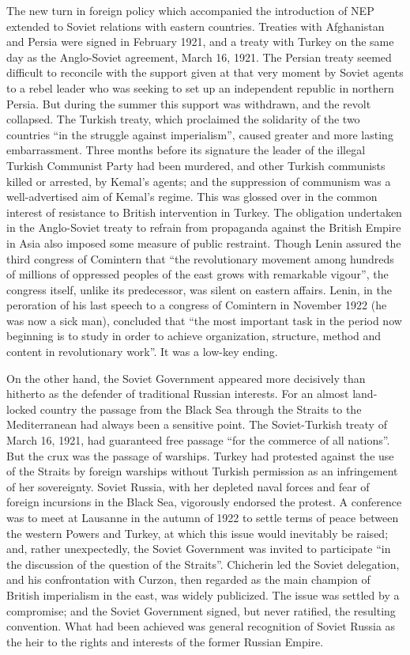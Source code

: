 The new turn in foreign policy which accompanied the introduction of NEP extended to Soviet relations with eastern countries. Treaties with Afghanistan and Persia were signed in February 1921, and a treaty with Turkey on the same day as the Anglo-Soviet agreement, March 16, 1921. The Persian treaty seemed difficult to reconcile with the support given at that very moment by Soviet agents to a rebel leader who was seeking to set up an independent republic in northern Persia. But during the summer this support was withdrawn, and the revolt collapsed. The Turkish treaty, which proclaimed the solidarity of the two countries ``in the struggle against imperialism'', caused greater and more lasting embarrassment. Three months before its signature the leader of the illegal Turkish Communist Party had been murdered, and other Turkish communists killed or arrested, by Kemal's agents; and the suppression of communism was a well-advertised aim of Kemal's regime. This was glossed over in the common interest of resistance to British intervention in Turkey. The obligation undertaken in the Anglo-Soviet treaty to refrain from propaganda against the British Empire in Asia also imposed some measure of public restraint. Though Lenin assured the third congress of Comintern that ``the revolutionary movement among hundreds of millions of oppressed peoples of the east grows with remarkable vigour'', the congress itself, unlike its predecessor, was silent on eastern affairs. Lenin, in the peroration of his last speech to a congress of Comintern in November 1922 (he was now a sick man), concluded that ``the most important task in the period now beginning is to study in order to achieve organization, structure, method and content in revolutionary work''. It was a low-key ending. 

On the other hand, the Soviet Government appeared more decisively than hitherto as the defender of traditional Russian interests. For an almost land-locked country the passage from the Black Sea through the Straits to the Mediterranean had always been a sensitive point. The Soviet-Turkish treaty of March 16, 1921, had guaranteed free passage ``for the commerce of all nations''. But the crux was the passage of warships. Turkey had protested against the use of the Straits by foreign warships without Turkish permission as an infringement of her sovereignty. Soviet Russia, with her depleted naval forces and fear of foreign incursions in the Black Sea, vigorously endorsed the protest. A conference was to meet at Lausanne in the autumn of 1922 to settle terms of peace between the western Powers and Turkey, at which this issue would inevitably be raised; and, rather unexpectedly, the Soviet Government was invited to participate ``in the discussion of the question of the Straits''. Chicherin led the Soviet delegation, and his confrontation with Curzon, then regarded as the main champion of British imperialism in the east, was widely publicized. The issue was settled by a compromise; and the Soviet Government signed, but never ratified, the resulting convention. What had been achieved was general recognition of Soviet Russia as the heir to the rights and interests of the former Russian Empire. 
